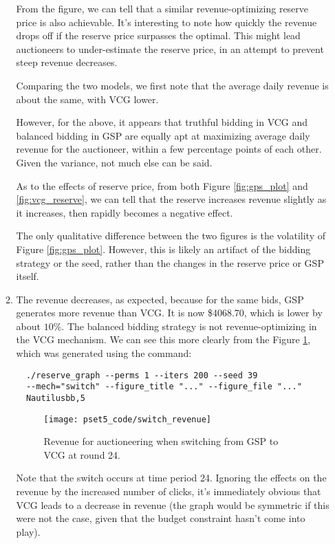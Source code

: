 \documentclass[11pt]{article}
\begin{document}
\begin{enumerate}[resume]
\begin{enumerate}
  From the figure, we can tell that a similar revenue-optimizing reserve price is also achievable. It's interesting to note how quickly the revenue drops off if the reserve price surpasses the optimal. This might lead auctioneers to under-estimate the reserve price, in an attempt to prevent steep revenue decreases.

  Comparing the two models, we first note that the average daily revenue is about the same, with VCG lower. 

  However, for the above, it appears that truthful bidding in VCG and balanced bidding in GSP are equally apt at maximizing average daily revenue for the auctioneer, within a few percentage points of each other. Given the variance, not much else can be said.

  As to the effects of reserve price, from both Figure \ref{fig:gps_plot} and \ref{fig:vcg_reserve}, we can tell that the reserve increases revenue slightly as it increases, then rapidly becomes a negative effect. 

  The only qualitative difference between the two figures is the volatility of Figure \ref{fig:gps_plot}. However, this is likely an artifact of the bidding strategy or the seed, rather than the changes in the reserve price or GSP itself.

  \item The revenue decreases, as expected, because for the same bids, GSP generates more revenue than VCG. It is now \$4068.70, which is lower by about $10\%$.  The balanced bidding strategy is not revenue-optimizing in the VCG mechanism. We can see this more clearly from the Figure \ref{fig:switch}, which was generated using the command:
   \begin{lstlisting}
  ./reserve_graph --perms 1 --iters 200 --seed 39 
  --mech="switch" --figure_title "..." --figure_file "..." 
  Nautilusbb,5
  \end{lstlisting}

  \begin{figure}[h!]
    \centering
    \texttt{[image: pset5\_code/switch\_revenue]}
    \caption{Revenue for auctioneering when switching from GSP to VCG at round 24.}
    \label{fig:switch}
  \end{figure}
  Note that the switch occurs at time period 24. Ignoring the effects on the revenue by the increased number of clicks, it's immediately obvious that VCG leads to a decrease in revenue (the graph would be symmetric if this were not the case, given that the budget constraint hasn't come into play). 
  

\end{enumerate}
\end{enumerate}
\end{document}

